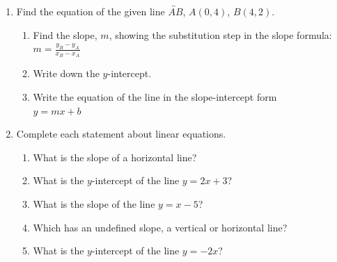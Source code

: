 \documentclass[12pt, twoside]{article}
\begin{document}
\begin{enumerate}
\newpage
\item Find the equation of the given line $\overleftrightarrow{AB}$, $A(0,4)$, $B(4,2)$.
\begin{multicols}{2}
    \begin{enumerate}[itemsep=1cm]
      \item Find the slope, $m$, showing the substitution step in the slope formula: \\[0.5cm]
      $\displaystyle m = \frac{y_B - y_A}{x_B - x_A}$\\[0.5cm]
      \item Write down the $y$-intercept.
      \item Write the equation of the line in the slope-intercept form\\[0.25cm]
      $y=mx+b$
      \end{enumerate}
    \begin{flushright}
    \end{flushright}
\end{multicols}

\newpage
\item Complete each statement about linear equations.
\begin{enumerate}[itemsep=0.5cm]
  \item What is the slope of a horizontal line?
  \item What is the $y$-intercept of the line $y = 2x + 3$?
  \item What is the slope of the line $y = x - 5$?
  \item Which has an undefined slope, a vertical or horizontal line?
  \item What is the $y$-intercept of the line $y = -2x$?
\end{enumerate}


\end{enumerate}
\end{document}
